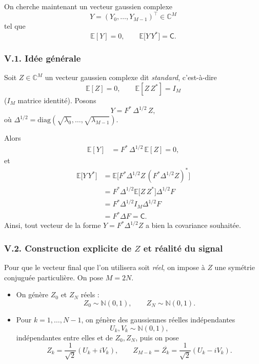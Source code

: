 \documentclass[11pt,a4paper]{article}
\newcommand{\C}{\mathbb{C}}
\newcommand{\N}{\mathbb{N}}
\newcommand{\E}{\mathbb{E}}
\newcommand{\1}{\mathbf{1}}
\begin{document}
On cherche maintenant un vecteur gaussien complexe
\[
  Y = (Y_0,\dots,Y_{M-1})^\top \in\C^M
\]
tel que
\begin{equation}
  \E[Y] = 0,
  \qquad
  \E\bigl[ Y\,Y^{\ast} \bigr] = \mathsf{C}.
\end{equation}

\subsubsection*{V.1. Idée générale}

Soit $Z\in\C^M$ un vecteur gaussien complexe dit \emph{standard},
c'est-à-dire
\begin{equation}
  \E[Z] = 0,
  \qquad
  \E[Z\,Z^{\ast}] = I_M
\end{equation}
($I_M$ matrice identité). Posons
\begin{equation}
  Y = F^{\ast}\,\Delta^{1/2}\,Z,
\end{equation}
où $\Delta^{1/2}=\mathrm{diag}(\sqrt{\lambda_0},\dots,
\sqrt{\lambda_{M-1}})$.

Alors
\begin{align}
  \E[Y]
  &= F^{\ast}\,\Delta^{1/2}\,\E[Z]
   = 0,
\end{align}
et
\begin{align}
  \E\bigl[Y\,Y^{\ast}\bigr]
  &= \E\bigl[
      F^{\ast}\Delta^{1/2}Z
      \, (F^{\ast}\Delta^{1/2}Z)^{\ast}
    \bigr] \\[0.3em]
  &= F^{\ast}\Delta^{1/2}
     \E\bigl[
       Z\,Z^{\ast}
     \bigr]
     \Delta^{1/2}F \\[0.3em]
  &= F^{\ast}\Delta^{1/2}
     I_M
     \Delta^{1/2}F \\[0.3em]
  &= F^{\ast}\Delta F
   = \mathsf{C}.
\end{align}
Ainsi, tout vecteur de la forme $Y=F^{\ast}\Delta^{1/2}Z$ a bien la
covariance souhaitée.

\subsubsection*{V.2. Construction explicite de $Z$ et réalité du signal}

Pour que le vecteur final que l'on utilisera soit \emph{réel}, on impose
à $Z$ une symétrie conjuguée particulière. On pose $M=2N$.

\begin{itemize}
  \item On génère $Z_0$ et $Z_N$ réels :
  \[
    Z_0 \sim \N(0,1),\qquad
    Z_N \sim \N(0,1).
  \]
  \item Pour $k=1,\dots,N-1$, on génère des gaussiennes réelles
        indépendantes
        \[
          U_k,V_k \sim \N(0,1),
        \]
        indépendantes entre elles et de $Z_0,Z_N$, puis on pose
        \[
          Z_k = \frac{1}{\sqrt{2}}(U_k + i V_k),
          \qquad
          Z_{M-k} = \overline{Z_k}
          = \frac{1}{\sqrt{2}}(U_k - i V_k).
        \]
\end{itemize}
\end{document}
